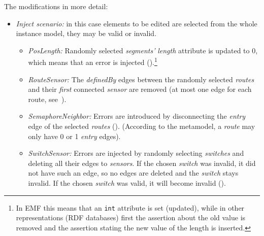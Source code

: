 The modifications in more detail:
\begin{itemize}
  \item \emph{Inject scenario:} in this case elements to be edited are selected from the whole instance model, \ie they may be valid or invalid. 
  \begin{itemize}
    
    \item \emph{PosLength:} Randomly selected \emph{segments'} \emph{length} attribute is updated to 0, which means that an error is injected ().\footnote{In EMF this means that an \texttt{int} attribute is set (updated), while in other representations (\eg RDF databases) first the assertion about the old value is removed and the assertion stating the new value of the length is inserted.}
    
    \item \emph{RouteSensor:} The \emph{definedBy} edges between the randomly selected \emph{routes} and their \emph{first} connected \emph{sensor} are removed (at most one edge for each route, see~).
    
    \item \emph{SemaphoreNeighbor:} Errors are introduced by disconnecting the \emph{entry} edge of the selected \emph{routes} (). (According to the metamodel, a \emph{route} may only have 0 or 1 \emph{entry} edges).

    \item \emph{SwitchSensor:} Errors are injected by randomly selecting \emph{switches} and deleting all their edges to \emph{sensors}. If the chosen \emph{switch} was invalid, it did not have such an edge, so no edges are deleted and the \emph{switch} stays invalid. If the chosen \emph{switch} was valid, it will become invalid ().
        
\end{itemize}
  

\end{itemize}
